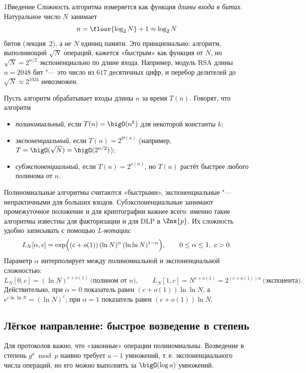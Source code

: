 \begin{lecture}{1}{Введение}
Сложность алгоритма измеряется как функция \emph{длины входа в битах}. Натуральное число $N$
занимает
\[
  n = \floor{\log_2 N} + 1 \approx \log_2 N
\]
битов (лекция~2), а \emph{не} $N$ единиц памяти. Это принципиально: алгоритм, выполняющий
$\sqrt N$ операций, кажется «быстрым» как функция от $N$, но $\sqrt N = 2^{n/2}$
экспоненциально по длине входа. Например, модуль RSA длины $n = 2048$ бит "--- это число из
$617$ десятичных цифр, и перебор делителей до $\sqrt N \approx 2^{1024}$ невозможен.

\begin{definition}\label{l1:classes}
Пусть алгоритм обрабатывает входы длины $n$ за время $T(n)$. Говорят, что алгоритм
\begin{itemize}
  \item \emph{полиномиальный}, если $T(n) = \bigO(n^k)$ для некоторой константы $k$;
  \item \emph{экспоненциальный}, если $T(n) = 2^{\Theta(n)}$ (например, $T = \bigO(\sqrt N) =
    \bigO(2^{n/2})$);
  \item \emph{субэкспоненциальный}, если $T(n) = 2^{o(n)}$, но $T(n)$ растёт быстрее любого
    полинома от $n$.
\end{itemize}
\end{definition}

Полиномиальные алгоритмы считаются «быстрыми», экспоненциальные "--- непрактичными для больших
входов. Субэкспоненциальные занимают промежуточное положение и для криптографии важнее всего:
именно такие алгоритмы известны для факторизации и для DLP в $\Znx{p}$. Их сложность удобно
записывать с помощью \emph{L-нотации}:
\[
  L_N[\alpha, c] = \exp\Bigl( (c + o(1)) \, (\ln N)^{\alpha} \, (\ln \ln N)^{1 - \alpha} \Bigr),
  \qquad 0 \le \alpha \le 1,\ c > 0.
\]
Параметр $\alpha$ интерполирует между полиномиальной и экспоненциальной сложностью:
\[
  L_N[0, c] = (\ln N)^{c + o(1)} \ \text{(полином от $n$)}, \qquad
  L_N[1, c] = N^{c + o(1)} = 2^{(c + o(1)) n} \ \text{(экспонента)}.
\]
Действительно, при $\alpha = 0$ показатель равен $(c + o(1)) \ln \ln N$, а
$e^{c \ln \ln N} = (\ln N)^c$; при $\alpha = 1$ показатель равен $(c + o(1)) \ln N$.

\subsection{Лёгкое направление: быстрое возведение в степень}

Для протоколов важно, что «законные» операции полиномиальны. Возведение в степень $g^a \bmod p$
наивно требует $a - 1$ умножений, т.\,е. экспоненциального числа операций, но его можно выполнить
за $\bigO(\log a)$ умножений.


\end{lecture}
